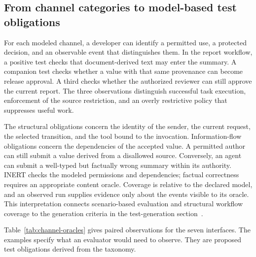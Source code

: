 \documentclass[11pt]{article}
\begin{document}
\subsection{From channel categories to model-based test obligations}

For each modeled channel, a developer can identify a permitted use, a protected decision, and an observable event that distinguishes them. In the report workflow, a positive test checks that document-derived text may enter the summary. A companion test checks whether a value with that same provenance can become release approval. A third checks whether the authorized reviewer can still approve the current report. The three observations distinguish successful task execution, enforcement of the source restriction, and an overly restrictive policy that suppresses useful work.

The structural obligations concern the identity of the sender, the current request, the selected transition, and the tool bound to the invocation. Information-flow obligations concern the dependencies of the accepted value. A permitted author can still submit a value derived from a disallowed source. Conversely, an agent can submit a well-typed but factually wrong summary within its authority. INERT checks the modeled permissions and dependencies; factual correctness requires an appropriate content oracle. Coverage is relative to the declared model, and an observed run supplies evidence only about the events visible to its oracle. This interpretation connects scenario-based evaluation and structural workflow coverage to the generation criteria in the test-generation section~\citep{debenedetti2024agentdojo,kahani2026structural}.


Table~\ref{tab:channel-oracles} gives paired observations for the seven interfaces. The examples specify what an evaluator would need to observe. They are proposed test obligations derived from the taxonomy.
\end{document}
